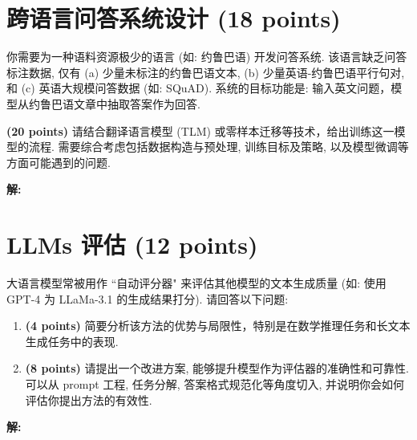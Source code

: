 \documentclass[8pt]{article}
\newcommand{\points}[1]{\textbf{(#1 points)}}
\begin{document}
\section{跨语言问答系统设计 \points{18}}

{\color{gray}
你需要为一种语料资源极少的语言 (如: 约鲁巴语) 开发问答系统. 
该语言缺乏问答标注数据, 仅有 (a) 少量未标注的约鲁巴语文本, (b) 少量英语-约鲁巴语平行句对, 和 (c) 英语大规模问答数据 (如: SQuAD).
系统的目标功能是: 输入英文问题，模型从约鲁巴语文章中抽取答案作为回答.

\points{20} 请结合翻译语言模型 (TLM) 或零样本迁移等技术，给出训练这一模型的流程.
需要综合考虑包括数据构造与预处理, 训练目标及策略, 以及模型微调等方面可能遇到的问题.
}

\textbf{\large 解:}
\vspace{8em}

\section{LLMs 评估 \points{12}}

{\color{gray}
大语言模型常被用作 ``自动评分器" 来评估其他模型的文本生成质量 (如: 使用 GPT-4 为 LLaMa-3.1 的生成结果打分). 请回答以下问题:
\begin{enumerate}
    \item \points{4} 简要分析该方法的优势与局限性，特别是在数学推理任务和长文本生成任务中的表现.
    \item \points{8} 请提出一个改进方案, 能够提升模型作为评估器的准确性和可靠性. 可以从 prompt 工程, 任务分解, 答案格式规范化等角度切入, 并说明你会如何评估你提出方法的有效性.
\end{enumerate}
}

\textbf{\large 解:}
\end{document}
